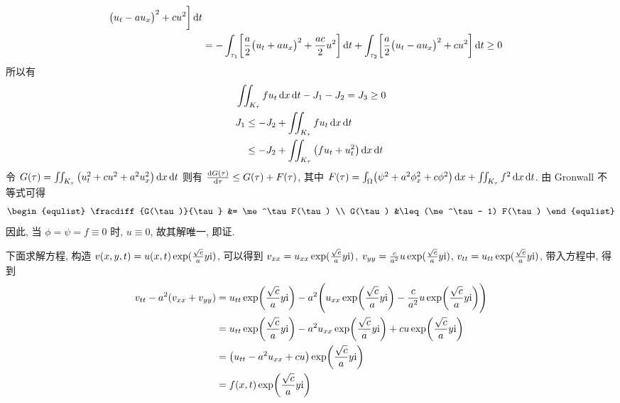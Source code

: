 \begin{solution}
\begin{align*}
        \bigl( u_t - a u_x \bigr)^2 + cu^2 \biggr] \operatorname{d\!} t \\
&= -\int_{\tau_1} \biggl[ \frac{a}{2}
    \bigl( u_t + a u_x \bigr)^2 + \frac{ac}{2}u^2 \biggr] \operatorname{d\!} t
    + \int_{\tau_2} \biggl[ \frac{a}{2}
        \bigl( u_t - a u_x \bigr)^2 + cu^2 \biggr] \operatorname{d\!} t \geq 0
\end{align*}
所以有
\begin{align*}
& \iint_{K_\tau} f u_t \operatorname{d\!} x \operatorname{d\!} t - J_1 - J_2 = J_3 \geq 0 \\
& J_1 \leq -J_2 + \iint_{K_\tau} f u_t \operatorname{d\!} x \operatorname{d\!} t \\
&\quad\leq -J_2 + \iint_{K_\tau} {\left( {f u_t + u_t^2} \right)} \operatorname{d\!} x \operatorname{d\!} t
\end{align*}
令 $G(\tau) = \iint_{K_\tau}{\left( {u_t^2 + c u^2 + a^2 u_x^2} \right)}\operatorname{d\!} x\operatorname{d\!} t$
则有 ${\frac{\operatorname{d\!} {G(\tau)}}{\operatorname{d\!} {\tau}}} \leq G(\tau) + F(\tau)$, 其中
$F(\tau) = \int_\Omega \bigl( \psi^2 + a^2 \phi_x^2 + c\phi^2 \bigr) \operatorname{d\!} x
+\iint_{K_\tau} f^2 \operatorname{d\!} x \operatorname{d\!} t$.
由 Gronwall 不等式可得
\[ \begin{equlist}
\fracdiff{G(\tau)}{\tau} &= \me^\tau F(\tau) \\
    G(\tau) &\leq (\me^\tau - 1) F(\tau)
\end{equlist} \]
因此, 当 $\phi = \psi = f \equiv 0$ 时, $u \equiv 0$, 故其解唯一, 即证.

下面求解方程, 构造 $v(x, y, t) = u(x, t) \* \exp(\frac{\sqrt{c}}{a}y\mi)$,
可以得到 $v_{xx} = u_{xx} \* \exp(\frac{\sqrt{c}}{a}y\mi)$,
$v_{yy} = \frac{c}{a^2} u \* \exp(\frac{\sqrt{c}}{a}y\mi)$,
$v_{tt} = u_{tt} \* \exp(\frac{\sqrt{c}}{a}y\mi)$, 带入方程中, 得到
\begin{align*}
v_{tt} - a^2 (v_{xx} + v_{yy})
&= u_{tt} \* \exp\biggl(\frac{\sqrt{c}}{a}y\mi\biggr)
    - a^2 \Biggl(
        u_{xx} \* \exp\biggl(\frac{\sqrt{c}}{a}y\mi\biggr)
        - \frac{c}{a^2} \* u \* \exp\biggl(\frac{\sqrt{c}}{a}y\mi\biggr)
    \Biggr) \\
&= u_{tt} \* \exp\biggl(\frac{\sqrt{c}}{a}y\mi\biggr)
    - a^2 u_{xx} \* \exp\biggl(\frac{\sqrt{c}}{a}y\mi\biggr)
    + c u \* \exp\biggl(\frac{\sqrt{c}}{a}y\mi\biggr) \\
&= \mclosure{u_{tt} - a^2 u_{xx} + cu}
    \* \exp\biggl(\frac{\sqrt{c}}{a}y\mi\biggr) \\
&= f(x, t) \* \exp\biggl(\frac{\sqrt{c}}{a}y\mi\biggr)
\end{align*}


\end{solution}
